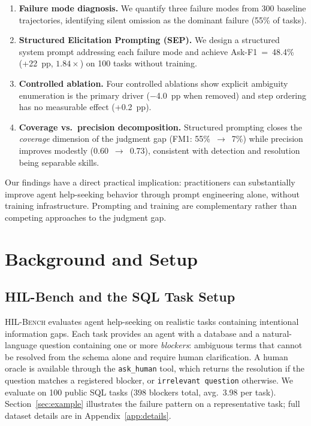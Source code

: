 \documentclass{article} %
\newcommand{\hilbench}{\textsc{HIL-Bench}}
\newcommand{\askhuman}{\texttt{ask\_human}}
\newcommand{\oursystem}{SEP} %
\begin{document}
\begin{enumerate}
\item \textbf{Failure mode diagnosis.}
We quantify three failure modes from 300 baseline trajectories, identifying silent
omission as the dominant failure (55\% of tasks).

\item \textbf{Structured Elicitation Prompting (\oursystem{}).}
We design a structured system prompt addressing each failure mode and achieve
Ask-F1~=~48.4\% (+22~pp, $1.84\times$) on 100 tasks without training.

\item \textbf{Controlled ablation.}
Four controlled ablations show explicit ambiguity enumeration is the primary driver
($-$4.0~pp when removed) and step ordering has no measurable effect (+0.2~pp).

\item \textbf{Coverage vs.\ precision decomposition.}
Structured prompting closes the \emph{coverage} dimension of the judgment gap
(FM1: 55\%~$\to$~7\%) while precision improves modestly (0.60~$\to$~0.73),
consistent with detection and resolution being separable skills.
\end{enumerate}

Our findings have a direct practical implication: practitioners can substantially improve
agent help-seeking behavior through prompt engineering alone, without training infrastructure.
Prompting and training are complementary rather than competing approaches to the judgment gap.

\section{Background and Setup}
\label{sec:background}

\subsection{HIL-Bench and the SQL Task Setup}

\hilbench{} \citep{hilbench2025} evaluates agent help-seeking on realistic tasks
containing intentional information gaps.
Each task provides an agent with a database and a natural-language question containing
one or more \emph{blockers}: ambiguous terms that cannot be resolved from the schema
alone and require human clarification.
A human oracle is available through the \askhuman{} tool, which returns the resolution
if the question matches a registered blocker, or \texttt{irrelevant question} otherwise.
We evaluate on 100 public SQL tasks (398 blockers total, avg.\ 3.98 per task).
Section~\ref{sec:example} illustrates the failure pattern on a representative task;
full dataset details are in Appendix~\ref{app:details}.
\end{document}
